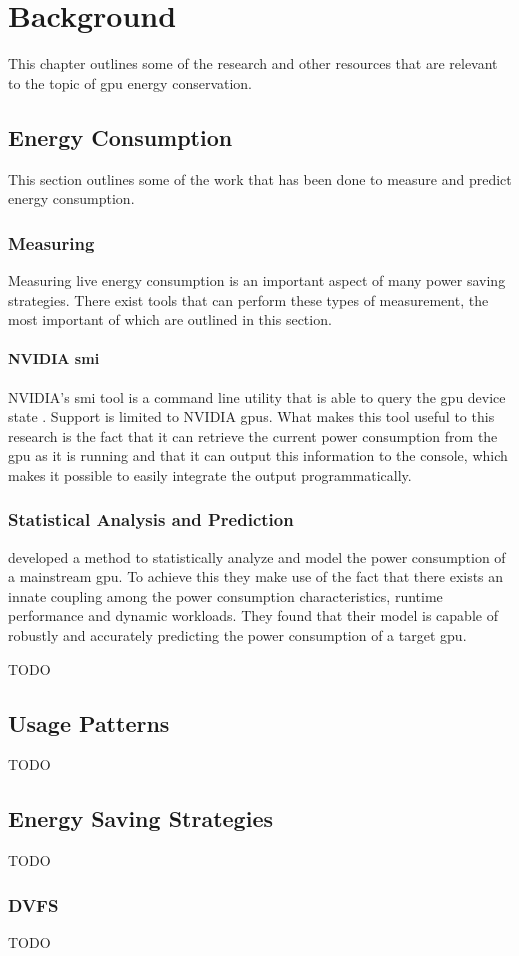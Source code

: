 \chapter{Background}
	This chapter outlines some of the research and other resources that are relevant to the topic of \gls{gpu} energy conservation.

	\section{Energy Consumption}
		This section outlines some of the work that has been done to measure and predict energy consumption.

		\subsection{Measuring}
			Measuring live energy consumption is an important aspect of many power saving strategies.
			There exist tools that can perform these types of measurement, the most important of which are outlined in this section.

			\subsubsection{NVIDIA \acrlong{smi}}
				NVIDIA's \gls{smi} tool is a command line utility that is able to query the \gls{gpu} device state \parencite{NVIDIA}.
				Support is limited to NVIDIA \glspl{gpu}.
				What makes this tool useful to this research is the fact that it can retrieve the current power consumption from the \gls{gpu} as it is running and that it can output this information to the console, which makes it possible to easily integrate the output programmatically.

		\subsection{Statistical Analysis and Prediction}
			\textcite{Ma2009} developed a method to statistically analyze and model the power consumption of a mainstream \gls{gpu}.
			To achieve this they make use of the fact that there exists an innate coupling among the power consumption characteristics, runtime performance and dynamic workloads.
			They found that their model is capable of robustly and accurately predicting the power consumption of a target \gls{gpu}.

			\textcite{Chen2011} TODO

	\section{Usage Patterns}
		TODO

	\section{Energy Saving Strategies}
		TODO

		\subsection{DVFS}
			TODO